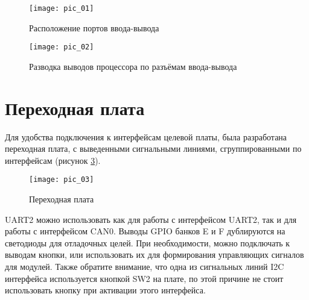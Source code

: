 \begin{center}
	\begin{figure}
		\texttt{[image: pic\_01]}
		\caption{Расположение портов ввода-вывода}
		\label{fig:fig1}
	\end{figure}
\end{center}

\begin{center}
	\begin{figure}
		\centering\texttt{[image: pic\_02]}
		\caption{Разводка выводов процессора по разъёмам ввода-вывода}
		\label{fig:fig2}
	\end{figure}
\end{center}

\vspace{10mm}
\section*{Переходная плата}
Для удобства подключения к интерфейсам целевой платы, была разработана переходная плата, с выведенными сигнальными линиями, сгруппированными по интерфейсам (рисунок \ref{fig:fig3}).  

\begin{figure}[hbt!]
	\centering\texttt{[image: pic\_03]}
	\caption{Переходная плата}
	\label{fig:fig3}
\end{figure}

UART2 можно использовать как для работы с интерфейсом UART2, так и для работы с интерфейсом CAN0. Выводы GPIO банков E и F дублируются на светодиоды для отладочных целей. При необходимости, можно подключать к выводам кнопки, или использовать их для формирования управляющих сигналов для модулей. Также обратите внимание, что одна из сигнальных линий I2C интерфейса используется кнопкой SW2 на плате, по этой причине не стоит использовать кнопку при активации этого интерфейса.    


